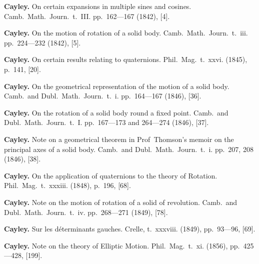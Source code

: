 \documentclass[12pt,a4paper]{article}
\theoremstyle{definition}
\begin{document}
\vspace{0.5em}

\noindent\textbf{Cayley.} On certain expansions in multiple sines and cosines. Camb.~Math.~Journ.~t.~III. pp.~162---167 (1842), [4].

\vspace{0.5em}

\noindent\textbf{Cayley.} On the motion of rotation of a solid body. Camb.~Math.~Journ.~t.~iii. pp.~224---232 (1842), [5].

\vspace{0.5em}

\noindent\textbf{Cayley.} On certain results relating to quaternions. Phil.~Mag.~t.~xxvi. (1845), p.~141, [20].

\vspace{0.5em}

\noindent\textbf{Cayley.} On the geometrical representation of the motion of a solid body. Camb.~and Dubl.~Math.~Journ.~t.~i. pp.~164---167 (1846), [36].

\vspace{0.5em}

\noindent\textbf{Cayley.} On the rotation of a solid body round a fixed point. Camb.~and Dubl.~Math.~Journ.~t.~I. pp.~167---173 and 264---274 (1846), [37].

\vspace{0.5em}

\noindent\textbf{Cayley.} Note on a geometrical theorem in Prof~Thomson's memoir on the principal axes of a solid body. Camb.~and Dubl.~Math.~Journ.~t.~i. pp.~207, 208 (1846), [38].

\vspace{0.5em}

\noindent\textbf{Cayley.} On the application of quaternions to the theory of Rotation. Phil.~Mag.~t.~xxxiii. (1848), p.~196, [68].

\vspace{0.5em}

\noindent\textbf{Cayley.} Note on the motion of rotation of a solid of revolution. Camb.~and Dubl.~Math.~Journ.~t.~iv. pp.~268---271 (1849), [78].

\vspace{0.5em}

\noindent\textbf{Cayley.} Sur les d\'{e}terminants gauches. Crelle, t.~xxxviii. (1849), pp.~93---96, [69].

\vspace{0.5em}

\noindent\textbf{Cayley.} Note on the theory of Elliptic Motion. Phil.~Mag.~t.~xi. (1856), pp.~425---428, [199].
\end{document}
